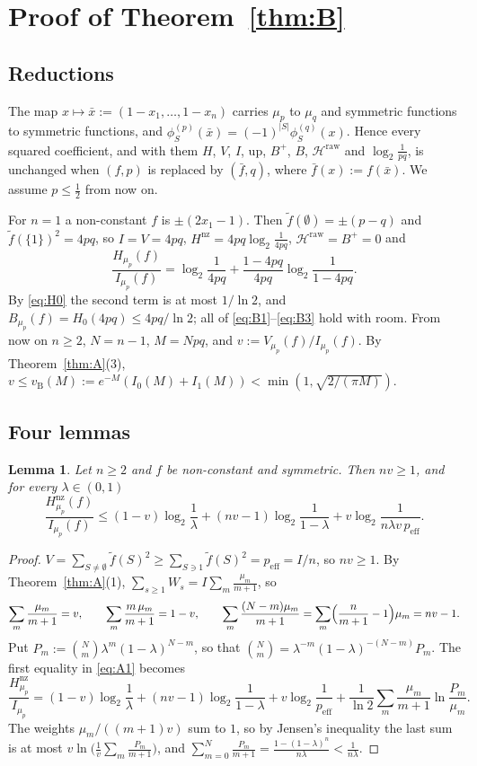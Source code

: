 \documentclass[11pt]{amsart}
\newtheorem{lemma}{Lemma}[section]
\theoremstyle{remark}
\newcommand{\Hraw}{\mathcal{H}^{\mathrm{raw}}}
\newcommand{\up}{\mathrm{up}}
\newcommand{\peff}{p_{\mathrm{eff}}}
\newcommand{\ft}{\tilde f}
\begin{document}
\section{Proof of Theorem~\ref{thm:B}}\label{sec:B}

\subsection{Reductions}\label{ssec:red}
The map $x \mapsto \bar x := (1 - x_1, \dots, 1 - x_n)$ carries $\mu_p$ to $\mu_q$ and symmetric functions to symmetric functions, and $\phi_S^{(p)}(\bar x) = (-1)^{|S|}\phi_S^{(q)}(x)$. Hence every squared coefficient, and with them $H$, $V$, $I$, $\up$, $B^+$, $B$, $\Hraw$ and $\log_2\frac{1}{pq}$, is unchanged when $(f, p)$ is replaced by $(\bar f, q)$, where $\bar f(x) := f(\bar x)$. We assume $p \le \frac12$ from now on.

For $n = 1$ a non-constant $f$ is $\pm(2x_1 - 1)$. Then $\ft(\emptyset) = \pm(p - q)$ and $\ft(\{1\})^2 = 4pq$, so $I = V = 4pq$, $H^{\mathrm{nz}} = 4pq\log_2\frac{1}{4pq}$, $\Hraw = B^+ = 0$ and
\[
\frac{H_{\mu_p}(f)}{I_{\mu_p}(f)} = \log_2\frac{1}{4pq} + \frac{1 - 4pq}{4pq}\log_2\frac{1}{1 - 4pq}.
\]
By \eqref{eq:H0} the second term is at most $1/\ln 2$, and $B_{\mu_p}(f) = H_0(4pq) \le 4pq/\ln 2$; all of \eqref{eq:B1}--\eqref{eq:B3} hold with room. From now on $n \ge 2$, $N = n - 1$, $M = Npq$, and $v := V_{\mu_p}(f)/I_{\mu_p}(f)$. By Theorem~\ref{thm:A}(3), $v \le v_{\mathrm B}(M) := e^{-M}(I_0(M) + I_1(M)) < \min(1, \sqrt{2/(\pi M)})$.

\subsection{Four lemmas}\label{ssec:lemmas}

\begin{lemma}\label{lem:tilt}
Let $n \ge 2$ and $f$ be non-constant and symmetric. Then $nv \ge 1$, and for every $\lambda \in (0,1)$
\[
\frac{H^{\mathrm{nz}}_{\mu_p}(f)}{I_{\mu_p}(f)} \le (1 - v)\log_2\frac1\lambda + (nv - 1)\log_2\frac{1}{1-\lambda} + v\log_2\frac{1}{n\lambda v\,\peff}.
\]
\end{lemma}

\begin{proof}
$V = \sum_{S \ne \emptyset}\ft(S)^2 \ge \sum_{S \ni 1}\ft(S)^2 = \peff = I/n$, so $nv \ge 1$. By Theorem~\ref{thm:A}(1), $\sum_{s \ge 1} W_s = I\sum_m \frac{\mu_m}{m+1}$, so
\[
\sum_m \frac{\mu_m}{m+1} = v, \qquad \sum_m \frac{m\,\mu_m}{m+1} = 1 - v, \qquad \sum_m \frac{(N - m)\mu_m}{m+1} = \sum_m \Bigl(\frac{n}{m+1} - 1\Bigr)\mu_m = nv - 1.
\]
Put $P_m := \binom{N}{m}\lambda^m(1-\lambda)^{N-m}$, so that $\binom{N}{m} = \lambda^{-m}(1-\lambda)^{-(N-m)}P_m$. The first equality in \eqref{eq:A1} becomes
\[
\frac{H^{\mathrm{nz}}_{\mu_p}}{I_{\mu_p}} = (1 - v)\log_2\frac1\lambda + (nv - 1)\log_2\frac{1}{1-\lambda} + v\log_2\frac{1}{\peff} + \frac{1}{\ln 2}\sum_m \frac{\mu_m}{m+1}\ln\frac{P_m}{\mu_m}.
\]
The weights $\mu_m/((m+1)v)$ sum to $1$, so by Jensen's inequality the last sum is at most $v\ln\bigl(\frac1v\sum_m \frac{P_m}{m+1}\bigr)$, and $\sum_{m=0}^N \frac{P_m}{m+1} = \frac{1 - (1-\lambda)^n}{n\lambda} < \frac{1}{n\lambda}$.
\end{proof}
\end{document}
